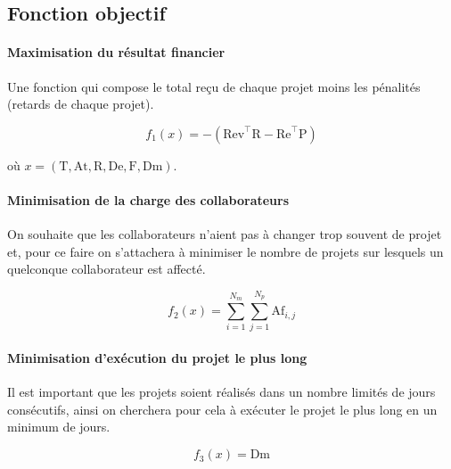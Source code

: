 \documentclass[12pt, a4paper, english, version=last, parskip=half, titlepage]{scrartcl}
\begin{document}
\subsection{Fonction objectif}

\paragraph{Maximisation du résultat financier}
Une fonction qui compose le total reçu de chaque projet moins les pénalités (retards de chaque projet).

\begin{equation*}
    f_1(x) = - (\text{Rev}^{\intercal}\text{R} - \text{Re}^{\intercal}\text{P})
\end{equation*}

où $x = (\text{T}, \text{At}, \text{R}, \text{De}, \text{F}, \text{Dm})$.

\paragraph{Minimisation de la charge des collaborateurs} On souhaite que les collaborateurs n’aient pas à changer trop souvent de projet et, pour ce faire on s’attachera à minimiser le nombre de projets sur lesquels un quelconque collaborateur est affecté.

\begin{equation*}
    f_2(x) = \sum_{i=1}^{N_m} \sum_{j=1}^{N_p} \text{Af}_{i,j}
\end{equation*}

\paragraph{Minimisation d'exécution du projet le plus long} Il est important que les projets soient réalisés dans un nombre limités de jours consécutifs, ainsi on cherchera pour cela à exécuter le projet le plus long en un minimum de jours. 

\begin{equation*}
    f_3(x) = \text{Dm}
\end{equation*}
\end{document}
